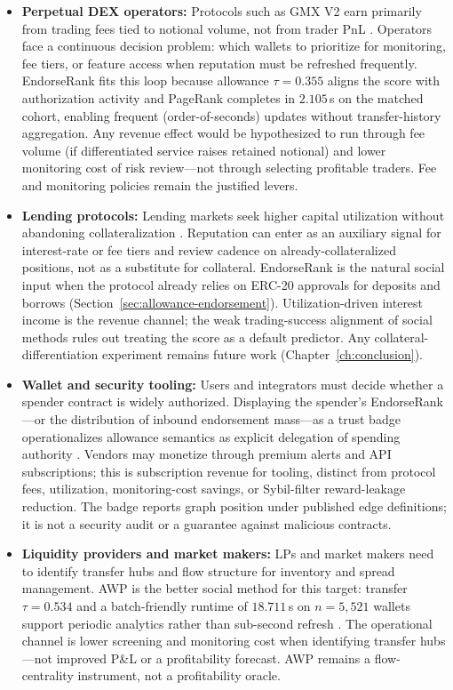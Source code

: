 \begin{itemize}
\item \textbf{Perpetual DEX operators:} Protocols such as GMX V2 earn primarily from trading fees tied to notional volume, not from trader PnL . Operators face a continuous decision problem: which wallets to prioritize for monitoring, fee tiers, or feature access when reputation must be refreshed frequently. EndorseRank fits this loop because allowance $\tau=0.355$ aligns the score with authorization activity and PageRank completes in $2.105$\,s on the matched cohort, enabling frequent (order-of-seconds) updates without transfer-history aggregation. Any revenue effect would be hypothesized to run through fee volume (if differentiated service raises retained notional) and lower monitoring cost of risk review---not through selecting profitable traders. Fee and monitoring policies remain the justified levers.

\item \textbf{Lending protocols:} Lending markets seek higher capital utilization without abandoning collateralization . Reputation can enter as an auxiliary signal for interest-rate or fee tiers and review cadence on already-collateralized positions, not as a substitute for collateral. EndorseRank is the natural social input when the protocol already relies on ERC-20 approvals for deposits and borrows (Section~\ref{sec:allowance-endorsement}). Utilization-driven interest income is the revenue channel; the weak trading-success alignment of social methods rules out treating the score as a default predictor. Any collateral-differentiation experiment remains future work (Chapter~\ref{ch:conclusion}).

\item \textbf{Wallet and security tooling:} Users and integrators must decide whether a spender contract is widely authorized. Displaying the spender's EndorseRank---or the distribution of inbound endorsement mass---as a trust badge operationalizes allowance semantics as explicit delegation of spending authority . Vendors may monetize through premium alerts and API subscriptions; this is subscription revenue for tooling, distinct from protocol fees, utilization, monitoring-cost savings, or Sybil-filter reward-leakage reduction. The badge reports graph position under published edge definitions; it is not a security audit or a guarantee against malicious contracts.

\item \textbf{Liquidity providers and market makers:} LPs and market makers need to identify transfer hubs and flow structure for inventory and spread management. AWP is the better social method for this target: transfer $\tau=0.534$ and a batch-friendly runtime of $18.711$\,s on $n=5{,}521$ wallets support periodic analytics rather than sub-second refresh . The operational channel is lower screening and monitoring cost when identifying transfer hubs---not improved P\&L or a profitability forecast. AWP remains a flow-centrality instrument, not a profitability oracle.


\end{itemize}
